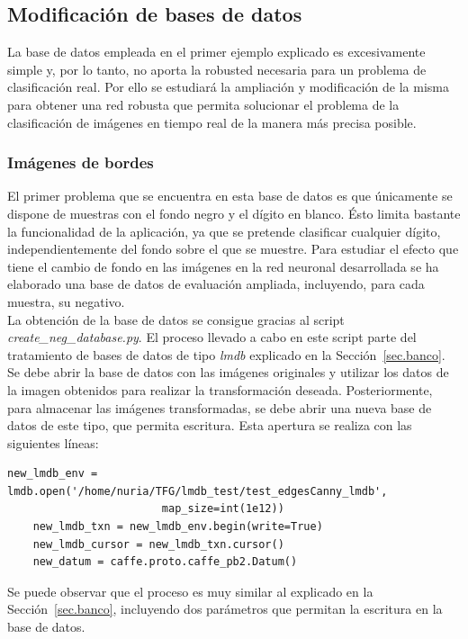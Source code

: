 \subsection{Modificación de bases de datos} \label{sec.mod_bbdd}

La base de datos empleada en el primer ejemplo explicado es excesivamente simple y, por lo tanto, no aporta la robusted necesaria para un problema de clasificación real. Por ello se estudiará la ampliación y modificación de la misma para obtener una red robusta que permita solucionar el problema de la clasificación de imágenes en tiempo real de la manera más precisa posible.\\

\subsubsection{Imágenes de bordes} \label{sec.bordes}
El primer problema que se encuentra en esta base de datos es que únicamente se dispone de muestras con el fondo negro y el dígito en blanco. Ésto limita bastante la funcionalidad de la aplicación, ya que se pretende clasificar cualquier dígito, independientemente del fondo sobre el que se muestre. Para estudiar el efecto que tiene el cambio de fondo en las imágenes en la red neuronal desarrollada se ha elaborado una base de datos de evaluación ampliada, incluyendo, para cada muestra, su negativo.\\

La obtención de la base de datos se consigue gracias al script \textit{create\_neg\_database.py}. El proceso llevado a cabo en este script parte del tratamiento de bases de datos de tipo \textit{lmdb} explicado en la Sección~\ref{sec.banco}. Se debe abrir la base de datos con las imágenes originales y utilizar los datos de la imagen obtenidos para realizar la transformación deseada. Posteriormente, para almacenar las imágenes transformadas, se debe abrir una nueva base de datos de este tipo, que permita escritura. Esta apertura se realiza con las siguientes líneas:
\vspace{10pt}
\begin{lstlisting}[frame=single]
	new_lmdb_env = lmdb.open('/home/nuria/TFG/lmdb_test/test_edgesCanny_lmdb',
						map_size=int(1e12))
	new_lmdb_txn = new_lmdb_env.begin(write=True)
	new_lmdb_cursor = new_lmdb_txn.cursor()
	new_datum = caffe.proto.caffe_pb2.Datum()
\end{lstlisting}

Se puede observar que el proceso es muy similar al explicado en la Sección~\ref{sec.banco}, incluyendo dos parámetros que permitan la escritura en la base de datos.\\

